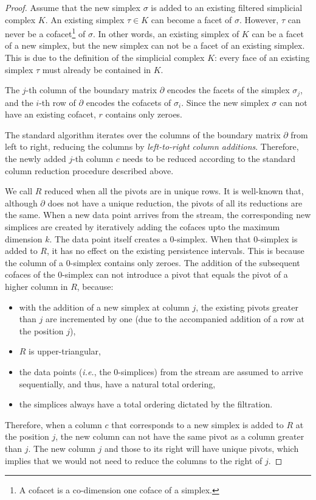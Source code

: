 \documentclass[11pt]{article}
\begin{document}
\begin{proof}
	
	Assume that the new simplex $\sigma$ is added to an existing filtered simplicial complex $K$.  
	An existing simplex $\tau \in K$ can become a facet of $\sigma$.  However, $\tau$ can never be 
	a cofacet\footnote{A cofacet is a co-dimension one coface of a simplex.} of $\sigma$.  In other 
	words, an existing simplex of $K$ can be a facet of a new simplex, but the new simplex can not 
	be a facet of an existing simplex.  This is due to the definition of the simplicial complex 
	$K$: every face of an existing simplex $\tau$ must already be contained in $K$.
	
	The $j$-th column of the boundary matrix $\partial$ encodes the facets of the simplex 
	$\sigma_j$, and the $i$-th row of $\partial$ encodes the cofacets of $\sigma_i$.  Since the new 
	simplex $\sigma$ can not have an existing cofacet, $r$ contains only zeroes.
	
	
	The standard algorithm iterates over the columns of the boundary matrix $\partial$ from left to 
	right, reducing the columns by \emph{left-to-right column additions}.  Therefore, the newly 
	added $j$-th column $c$ needs to be reduced according to the standard column reduction 
	procedure described above.
	
	
	We call $R$ reduced when all the pivots are in unique rows.  It is well-known that, although 
	$\partial$ does not have a unique reduction, the pivots of all its reductions are the same.  
	When a new data point arrives from the stream, the corresponding new simplices are created by 
	iteratively adding the cofaces upto the maximum dimension $k$.  The data point itself creates a 
	0-simplex.  When that 0-simplex is added to $R$, it has no effect on the existing persistence 
	intervals.  This is because the column of a 0-simplex contains only zeroes.  The addition of 
	the subsequent cofaces of the 0-simplex can not introduce a pivot that equals the pivot of a 
	higher column in $R$, because:
	
	
	\begin{itemize}
		\item with the addition of a new simplex at column $j$, the existing pivots greater than 
		$j$ are incremented by one (due to the accompanied addition of a row at the position $j$),
		\item $R$ is upper-triangular,
		\item the data points (\textit{i.e.}, the 0-simplices) from the stream are assumed to 
		arrive sequentially, and thus, have a natural total ordering,
		\item the simplices always have a total ordering dictated by the filtration.
	\end{itemize}
	
	
	Therefore, when a column $c$ that corresponds to a new simplex is added to $R$ at the position 
	$j$, the new column can not have the same pivot as a column greater than $j$.  The new column 
	$j$ and those to its right will have unique pivots, which implies that we would not need to 
	reduce the columns to the right of $j$.
	
	
\end{proof}




\end{document}
